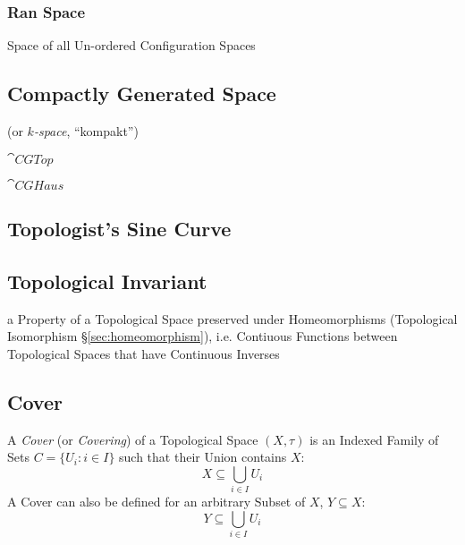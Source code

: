 \subsubsection{Ran Space}\label{sec:ran_space}

Space of all Un-ordered Configuration Spaces



\subsection{Compactly Generated Space}\label{sec:compactly_generated}

(or \emph{$k$-space}, ``kompakt'')

$\cat{CGTop}$

$\cat{CGHaus}$



\subsection{Topologist's Sine Curve}\label{sec:topologists_sine}

\subsection{Topological Invariant}\label{sec:topological_invariant}

a Property of a Topological Space preserved under Homeomorphisms
(Topological Isomorphism \S\ref{sec:homeomorphism}), i.e. Contiuous Functions
between Topological Spaces that have Continuous Inverses



\subsection{Cover}\label{sec:topological_cover}

A \emph{Cover} (or \emph{Covering}) of a Topological Space $(X, \tau)$
is an Indexed Family of Sets $C = \{ U_i : i \in I \}$ such that their
Union contains $X$:
\[
  X \subseteq \bigcup_{i \in I} U_i
\]
A Cover can also be defined for an arbitrary Subset of $X$, $Y
\subseteq X$:
\[
  Y \subseteq \bigcup_{i \in I} U_i
\]

